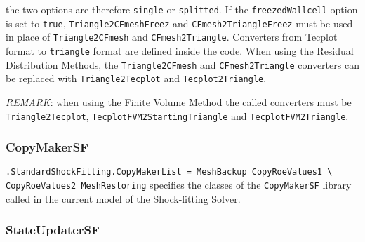 \documentclass[11pt,a4paper,oneside]{article}
\begin{document}
\newline
\newline
the two options are therefore \texttt{single} or \texttt{splitted}.
\newline
If the \texttt{freezedWallcell} option is set to \texttt{true}, \texttt{Triangle2CFmeshFreez} and \texttt{CFmesh2TriangleFreez} must be used in place of \texttt{Triangle2CFmesh} and \texttt{CFmesh2Triangle}.
\newline
\newline
Converters from Tecplot format to \texttt{triangle} format are defined inside the code. When using the Residual Distribution Methods, the \texttt{Triangle2CFmesh} and \texttt{CFmesh2Triangle} converters can be replaced with \texttt{Triangle2Tecplot} and \texttt{Tecplot2Triangle}.
\newline

\underline{\emph{REMARK}}: when using the Finite Volume Method the called converters must be \texttt{Triangle2Tecplot}, \texttt{TecplotFVM2StartingTriangle} and \texttt{TecplotFVM2Triangle}.

\subsubsection*{CopyMakerSF}

\hspace*{1cm} \texttt{.StandardShockFitting.CopyMakerList = MeshBackup CopyRoeValues1 \textbackslash{}}
\newline
\hspace*{8.6cm} \texttt{CopyRoeValues2 MeshRestoring}
\newline
\newline
specifies the classes of the \texttt{CopyMakerSF} library called in the current model of the Shock-fitting Solver.

\subsubsection*{StateUpdaterSF}
\label{subsubsec:state updater}
\end{document}
